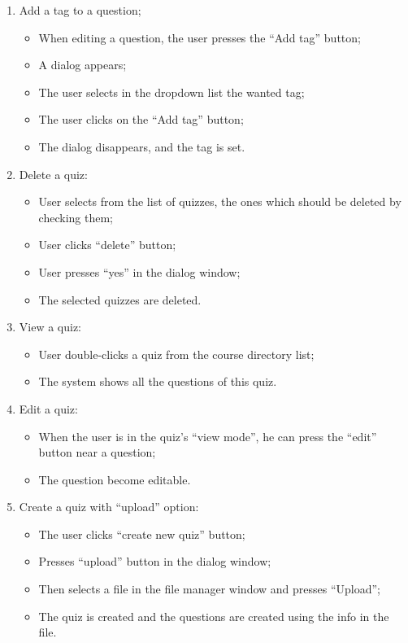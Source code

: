\begin{enumerate}
  \item Add a tag to a question;
  \begin{itemize}
    \item When editing a question, the user presses the “Add tag” button;
    \item A dialog appears;
    \item The user selects in the dropdown list the wanted tag;
    \item The user clicks on the “Add tag” button;
    \item The dialog disappears, and the tag is set.
  \end{itemize}    

  \item Delete a quiz:
  \begin{itemize}
    \item User selects from the list of quizzes, the ones which should be deleted by checking them;
    \item User clicks “delete” button;
    \item User presses “yes” in the dialog window;
    \item The selected quizzes are deleted.
  \end{itemize}    

  \item View a quiz:
  \begin{itemize}
    \item User double-clicks a quiz from the course directory list;
    \item The system shows all the questions of this quiz.
  \end{itemize}    

  \item Edit a quiz:
  \begin{itemize}
    \item When the user is in the quiz’s “view mode”, he can press the “edit” button near a question;
    \item The question become editable.
  \end{itemize}    

  \item Create a quiz with “upload” option:
  \begin{itemize}
    \item The user clicks “create new quiz” button;
    \item Presses “upload” button in the dialog window;
    \item Then selects a file in the file manager window and presses “Upload”;
    \item The quiz is created and the questions are created using the info in the file.
  \end{itemize}


\end{enumerate}
